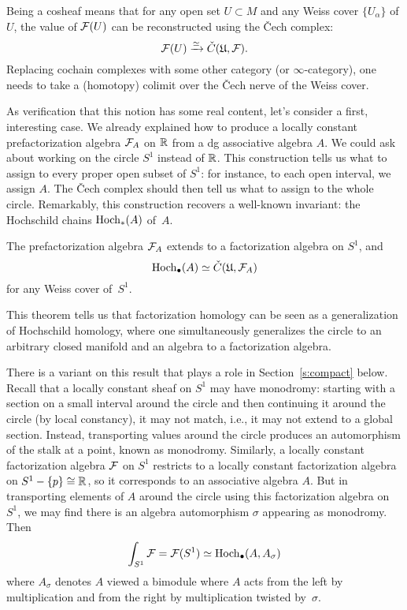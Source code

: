 \documentclass[11pt]{amsart}
\def\owen#1{{\textcolor{red!50!black}{OG: {#1}}}}
\begin{document}
Being a cosheaf means that for any open set $U \subset M$ and any Weiss cover $\{ U_\alpha\}$ of $U$,
the value of $\mathcal F(U)$ can be reconstructed using the \v{C}ech complex:
\[
\mathcal F(U) \xrightarrow{\simeq} \check{C}(\mathfrak{U},\mathcal F).
\]
Replacing cochain complexes with some other category (or $\infty$-category), one needs to take a (homotopy) colimit over the \v{C}ech nerve of the Weiss cover.

As verification that this notion has some real content, let's consider a first, interesting case.
We already explained how to produce a locally constant prefactorization algebra $\mathcal F_A$ on $\mathbb R$ from a dg associative algebra $A$.
We could ask about working on the circle $S^1$ instead of $\mathbb R$.
This construction tells us what to assign to every proper open subset of $S^1$: for instance, to each open interval, we assign $A$.
The \v{C}ech complex should then tell us what to assign to the whole circle.
Remarkably, this construction recovers a well-known invariant: the Hochschild chains ${\rm Hoch}_*(A)$ of~$A$.

\begin{thm}
The prefactorization algebra $\mathcal F_A$ extends to a factorization algebra on $S^1$, and
\[
{\rm Hoch}_\bullet(A) \simeq \check{C}(\mathfrak{U},\mathcal F_A)
\]
for any Weiss cover of~$S^1$.
\end{thm}

This theorem tells us that factorization homology can be seen as a generalization of Hochschild homology,
where one simultaneously generalizes the circle to an arbitrary closed manifold and an algebra to a factorization algebra.

There is a variant on this result that plays a role in Section~\ref{s:compact} below.
Recall that a locally constant sheaf on $S^1$ may have monodromy: 
starting with a section on a small interval around the circle and then continuing it around the circle (by local constancy),
it may not match,
i.e., it may not extend to a global section.
Instead, transporting values around the circle produces an automorphism of the stalk at a point, known as monodromy.
Similarly, a locally constant factorization algebra $\mathcal F$ on $S^1$ restricts to a locally constant factorization algebra on $S^1 - \{p\} \cong \mathbb R$,
so it corresponds to an associative algebra $A$.
But in transporting elements of $A$ around the circle using this factorization algebra on $S^1$,
we may find there is an algebra automorphism $\sigma$ appearing as monodromy.
Then
\[
\int_{S^1} \mathcal F = \mathcal F (S^1) \simeq {\rm Hoch}_\bullet(A, A_\sigma)
\]
where $A_\sigma$ denotes $A$ viewed a bimodule where $A$ acts from the left by multiplication and from the right by multiplication twisted by~$\sigma$.
\end{document}
